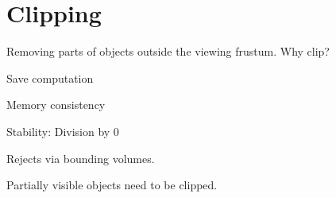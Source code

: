 \chapter{Clipping}
Removing parts of objects outside the viewing frustum.
Why clip?\\
\begin{enumerate*}[label=\protect\circled{\arabic*},itemjoin=]
	\item Save computation\\
	\item Memory consistency\\
	\item Stability: Division by 0
\end{enumerate*}
\begin{compactdesc}
	\item[\lp{Culling}] Rejects via bounding volumes.
	\item[\lp{Clipping}] Partially visible objects need to be clipped.

\end{compactdesc}
